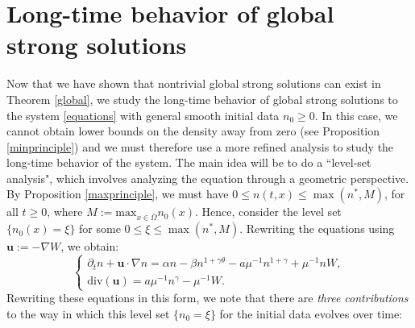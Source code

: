 \documentclass[12pt]{article}
\newcommand{\bd}{\boldsymbol}
\theoremstyle{plain}
\begin{document}
\fi 

\section{Long-time behavior of global strong solutions}\label{vacuumlongtime}

Now that we have shown that nontrivial global strong solutions can exist in Theorem \ref{global}, we study the long-time behavior of global strong solutions to the system \eqref{equations} with general smooth initial data $n_{0} \ge 0$. In this case, we cannot obtain lower bounds on the density away from zero (see Proposition \ref{minprinciple}) and we must therefore use a more refined analysis to study the long-time behavior of the system. The main idea will be to do a ``level-set analysis", which involves analyzing the equation through a geometric perspective. By Proposition \ref{maxprinciple}, we must have $0 \le n(t, x) \le \max(n^{*}, M)$, for all $t \ge 0$, 
where $\displaystyle M := \text{max}_{x \in \overline{\Omega}} n_{0}(x)$. Hence, consider the level set $\{n_{0}(x) = \xi\}$ for some $0 \le \xi \le \max(n^{*}, M)$. Rewriting the equations using $\bd{u} := -\nabla W$, we obtain:
\begin{equation}\label{rewritten}
\begin{cases}
\partial_{t} n + \bd{u} \cdot \nabla n = \alpha n - \beta n^{1 + \gamma \theta} - a\mu^{-1}n^{1 + \gamma} + \mu^{-1}nW, \\
\text{div}(\bd{u}) = a\mu^{-1} n^{\gamma} - \mu^{-1}W.
\end{cases}
\end{equation}
Rewriting these equations in this form, we note that there are \textit{three contributions} to the way in which this level set $\{n_{0} = \xi\}$ for the initial data evolves over time:
\end{document}
